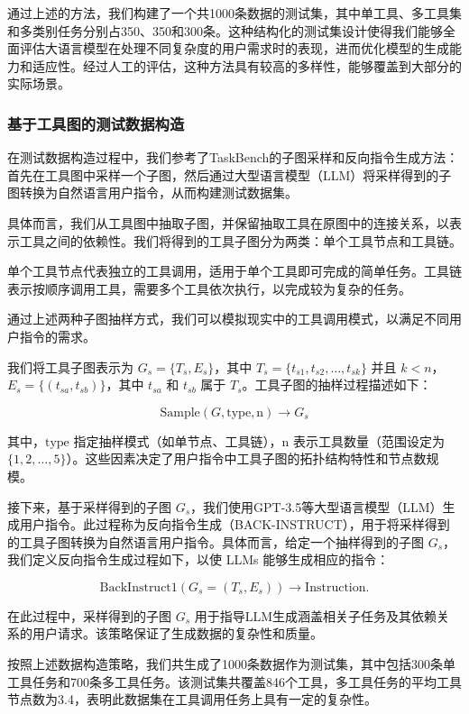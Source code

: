 通过上述的方法，我们构建了一个共1000条数据的测试集，其中单工具、多工具集和多类别任务分别占350、350和300条。这种结构化的测试集设计使得我们能够全面评估大语言模型在处理不同复杂度的用户需求时的表现，进而优化模型的生成能力和适应性。经过人工的评估，这种方法具有较高的多样性，能够覆盖到大部分的实际场景。

\subsubsection{基于工具图的测试数据构造}

在测试数据构造过程中，我们参考了TaskBench的子图采样和反向指令生成方法：首先在工具图中采样一个子图，然后通过大型语言模型（LLM）将采样得到的子图转换为自然语言用户指令，从而构建测试数据集。

具体而言，我们从工具图中抽取子图，并保留抽取工具在原图中的连接关系，以表示工具之间的依赖性。我们将得到的工具子图分为两类：单个工具节点和工具链。

单个工具节点代表独立的工具调用，适用于单个工具即可完成的简单任务。工具链表示按顺序调用工具，需要多个工具依次执行，以完成较为复杂的任务。

通过上述两种子图抽样方式，我们可以模拟现实中的工具调用模式，以满足不同用户指令的需求。

我们将工具子图表示为 \( G_s = \{T_s, E_s\} \)，其中 \( T_s = \{t_{s1}, t_{s2}, \dots, t_{sk}\} \) 并且 \( k < n \)，\( E_s = \{(t_{sa}, t_{sb})\} \)，其中 \( t_{sa} \) 和 \( t_{sb} \) 属于 \( T_s \)。工具子图的抽样过程描述如下：

\[
\text{Sample}(G, \text{type}, \text{n}) \rightarrow G_s
\]

其中，\(\text{type}\) 指定抽样模式（如单节点、工具链），\(\text{n}\) 表示工具数量（范围设定为 \(\{1, 2, \dots, 5\}\)）。这些因素决定了用户指令中工具子图的拓扑结构特性和节点数规模。

接下来，基于采样得到的子图 \( G_s \)，我们使用GPT-3.5等大型语言模型（LLM）生成用户指令。此过程称为反向指令生成（BACK-INSTRUCT），用于将采样得到的工具子图转换为自然语言用户指令。具体而言，给定一个抽样得到的子图 \( G_s \)，我们定义反向指令生成过程如下，以使 LLMs 能够生成相应的指令：

\[
\text{BackInstruct1}(G_s = (T_s, E_s)) \rightarrow \text{Instruction}.
\]

在此过程中，采样得到的子图 \( G_s \) 用于指导LLM生成涵盖相关子任务及其依赖关系的用户请求。该策略保证了生成数据的复杂性和质量。

按照上述数据构造策略，我们共生成了1000条数据作为测试集，其中包括300条单工具任务和700条多工具任务。该测试集共覆盖846个工具，多工具任务的平均工具节点数为3.4，表明此数据集在工具调用任务上具有一定的复杂性。

